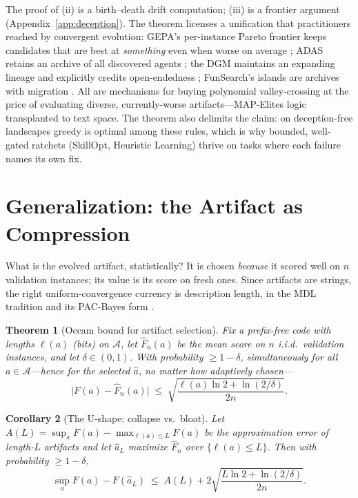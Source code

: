 \documentclass{article}
\theoremstyle{plain}
\newtheorem{theorem}{Theorem}[section]
\newtheorem{corollary}[theorem]{Corollary}
\theoremstyle{definition}
\theoremstyle{remark}
\newcommand{\A}{\mathcal{A}}
\newcommand{\len}{\ell}
\newcommand{\Fhat}{\widehat{F}}
\begin{document}
The proof of (ii) is a birth--death drift computation; (iii) is a frontier argument (Appendix~\ref{app:deception}). The theorem licenses a unification that practitioners reached by convergent evolution: GEPA's per-instance Pareto frontier keeps candidates that are best at \emph{something} even when worse on average \cite{agrawal2025gepa}; ADAS retains an archive of all discovered agents \cite{hu2025adas}; the DGM maintains an expanding lineage and explicitly credits open-endedness \cite{zhang2025dgm}; FunSearch's islands are archives with migration \cite{romeraparedes2024funsearch}. All are mechanisms for buying polynomial valley-crossing at the price of evaluating diverse, currently-worse artifacts---MAP-Elites logic \cite{mouret2015illuminating} transplanted to text space. The theorem also delimits the claim: on deception-free landscapes greedy is optimal among these rules, which is why bounded, well-gated ratchets (SkillOpt, Heuristic Learning) thrive on tasks where each failure names its own fix.

\section{Generalization: the Artifact as Compression}
\label{sec:compression}

What is the evolved artifact, statistically? It is chosen \emph{because} it scored well on $n$ validation instances; its value is its score on fresh ones. Since artifacts are strings, the right uniform-convergence currency is description length, in the MDL tradition \cite{rissanen1978modeling} and its PAC-Bayes form \cite{mcallester1999pac}.

\begin{theorem}[Occam bound for artifact selection]
\label{thm:occam}
Fix a prefix-free code with lengths $\len(a)$ (bits) on $\A$, let $\Fhat_n(a)$ be the mean score on $n$ i.i.d.\ validation instances, and let $\delta \in (0,1)$. With probability $\ge 1 - \delta$, simultaneously for \emph{all} $a \in \A$---hence for the selected $\hat{a}$, no matter how adaptively chosen---
\[
\big|F(a) - \Fhat_n(a)\big| \;\le\; \sqrt{\frac{\len(a) \ln 2 + \ln(2/\delta)}{2n}}.
\]
\end{theorem}

\begin{corollary}[The U-shape: collapse vs.\ bloat]
\label{cor:ushape}
Let $A(L) = \sup_a F(a) - \max_{\len(a) \le L} F(a)$ be the approximation error of length-$L$ artifacts and let $\hat{a}_L$ maximize $\Fhat_n$ over $\{\len(a) \le L\}$. Then with probability $\ge 1-\delta$,
\[
\sup_a F(a) - F(\hat{a}_L) \;\le\; A(L) + 2\sqrt{\frac{L \ln 2 + \ln(2/\delta)}{2n}} .
\]
\end{corollary}
\end{document}

